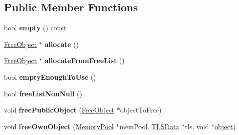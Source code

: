\subsection*{Public Member Functions}
\begin{DoxyCompactItemize}
\item 
\hypertarget{classrml_1_1internal_1_1Block_a2735c6aa7b8125920397f8070cd9ab58}{}bool {\bfseries empty} () const \label{classrml_1_1internal_1_1Block_a2735c6aa7b8125920397f8070cd9ab58}

\item 
\hypertarget{classrml_1_1internal_1_1Block_ab304c726e184fcd2cad31e30306e07ab}{}\hyperlink{structrml_1_1internal_1_1FreeObject}{Free\+Object} $\ast$ {\bfseries allocate} ()\label{classrml_1_1internal_1_1Block_ab304c726e184fcd2cad31e30306e07ab}

\item 
\hypertarget{classrml_1_1internal_1_1Block_a49c5382153edd22b031869f0a822f9f2}{}\hyperlink{structrml_1_1internal_1_1FreeObject}{Free\+Object} $\ast$ {\bfseries allocate\+From\+Free\+List} ()\label{classrml_1_1internal_1_1Block_a49c5382153edd22b031869f0a822f9f2}

\item 
\hypertarget{classrml_1_1internal_1_1Block_a55fa4335b0c9143767d514601bcede6b}{}bool {\bfseries empty\+Enough\+To\+Use} ()\label{classrml_1_1internal_1_1Block_a55fa4335b0c9143767d514601bcede6b}

\item 
\hypertarget{classrml_1_1internal_1_1Block_a624decb3bf1a4f7ab0b66e3ae0fb1324}{}bool {\bfseries free\+List\+Non\+Null} ()\label{classrml_1_1internal_1_1Block_a624decb3bf1a4f7ab0b66e3ae0fb1324}

\item 
\hypertarget{classrml_1_1internal_1_1Block_a66007bf10cb5ca6edf3734362e285279}{}void {\bfseries free\+Public\+Object} (\hyperlink{structrml_1_1internal_1_1FreeObject}{Free\+Object} $\ast$object\+To\+Free)\label{classrml_1_1internal_1_1Block_a66007bf10cb5ca6edf3734362e285279}

\item 
\hypertarget{classrml_1_1internal_1_1Block_a1a1ce525679cf6282e91d5839c1832e7}{}void {\bfseries free\+Own\+Object} (\hyperlink{classrml_1_1internal_1_1MemoryPool}{Memory\+Pool} $\ast$mem\+Pool, \hyperlink{classrml_1_1internal_1_1TLSData}{T\+L\+S\+Data} $\ast$tls, void $\ast$\hyperlink{structobject}{object})\label{classrml_1_1internal_1_1Block_a1a1ce525679cf6282e91d5839c1832e7}


\end{DoxyCompactItemize}
